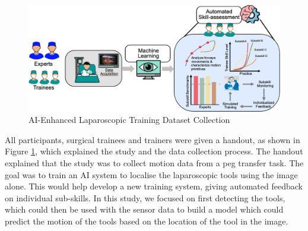 


\begin{figure}
    \centering
    \includegraphics[width=1\linewidth]{dataset_collection.png}
    \caption{AI-Enhanced Laparoscopic Training Dataset Collection}
    \label{fig:dataset-collection}
\end{figure}

All participants, surgical trainees and trainers were given a handout, as shown in Figure \ref{fig:dataset-collection}, which explained the study and the data collection process. The handout explained that the study was to collect motion data from a peg transfer task. The goal was to train an AI system to localise the laparoscopic tools using the image alone. This would help develop a new training system, giving automated feedback on individual sub-skills. In this study, we focused on first detecting the tools, which could then be used with the sensor data to build a model which could predict the motion of the tools based on the location of the tool in the image.

